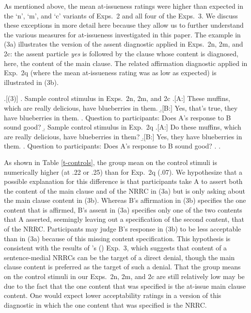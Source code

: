 \documentclass[a4paper,12pt,twoside]{article}
\newcommand{\posscite}[1]{\citeauthor{#1}'s (\citeyear{#1})}
\begin{document}
    As mentioned above, the mean at-issueness ratings were higher than expected in the `n', `m', and `c' variants of Exps.~2 and all four of the Exps.~3. We discuss these exceptions in more detail here because they allow us to further understand the various measures for at-issueness investigated in this paper. The example in (3a) illustrates the version of the assent diagnostic applied in Exps.~2n, 2m, and 2c: the assent particle {\em yes} is followed by the clause whose content is diagnosed, here, the content of the main clause. The related affirmation diagnostic applied in Exp.~2q (where the mean at-issueness rating was as low as expected) is illustrated in (3b).

    \ex.[(3)]
        \a. Sample control stimulus in Exps.~2n, 2m, and 2c
            \a.[A:] These muffins, which are really delicious, have blueberries in them.
            \b.[B:] Yes, that's true, they have blueberries in them.
            \z.
        Question to participants: Does A's response to B sound good?
        \b. Sample control stimulus in Exp.~2q
            \a.[A:] Do these muffins, which are really delicious, have blueberries in them?
            \b.[B:] Yes, they have blueberries in them.
            \z.
        Question to participants: Does A's response to B sound good?
        \z.
    \z.

    As shown in Table \ref{t-controls},  the group mean on the control stimuli is numerically higher (at .22 or .25) than for Exp.~2q (.07). We hypothesize that a possible explanation for this difference is that participants take A to assert both the content of the main clause and of the NRRC in (3a) but is only asking about the main clause content in (3b). Whereas B's affirmation in (3b) specifies the one content that is affirmed, B's assent in (3a) specifies only one of the two contents that A asserted, seemingly leaving out a specification of the second content, that of the NRRC. Participants may judge B's response in (3b) to be less acceptable than in (3a) because of this missing content specification. This hypothesis is consistent with the results of \posscite{syrett_experimental_2015} Exp.~3, which suggests that content of a sentence-medial NRRCs can be the target of a direct denial, though the main clause content is preferred as the target of such a denial. That the group means on the control stimuli in our Exps.~2n, 2m, and 2c are still relatively low may be due to the fact that the one content that was specified is the at-issue main clause content. One would expect lower acceptability ratings in a version of this diagnostic in which the one content that was specified is the NRRC.
\end{document}

